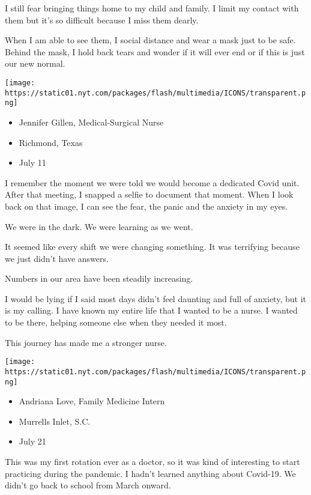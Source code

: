 I still fear bringing things home to my child and family. I limit my
contact with them but it's so difficult because I miss them dearly.

When I am able to see them, I social distance and wear a mask just to be
safe. Behind the mask, I hold back tears and wonder if it will ever end
or if this is just our new normal.

\texttt{[image: https://static01.nyt.com/packages/flash/multimedia/ICONS/transparent.png]}

\begin{itemize}
\tightlist
\item
  Jennifer Gillen, Medical-Surgical Nurse
\item
  Richmond, Texas
\item
  July 11
\end{itemize}

I remember the moment we were told we would become a dedicated Covid
unit. After that meeting, I snapped a selfie to document that moment.
When I look back on that image, I can see the fear, the panic and the
anxiety in my eyes.

We were in the dark. We were learning as we went.

It seemed like every shift we were changing something. It was terrifying
because we just didn't have answers.

Numbers in our area have been steadily increasing.

I would be lying if I said most days didn't feel daunting and full of
anxiety, but it is my calling. I have known my entire life that I wanted
to be a nurse. I wanted to be there, helping someone else when they
needed it most.

This journey has made me a stronger nurse.

\texttt{[image: https://static01.nyt.com/packages/flash/multimedia/ICONS/transparent.png]}

\begin{itemize}
\tightlist
\item
  Andriana Love, Family Medicine Intern
\item
  Murrells Inlet, S.C.
\item
  July 21
\end{itemize}

This was my first rotation ever as a doctor, so it was kind of
interesting to start practicing during the pandemic. I hadn't learned
anything about Covid-19. We didn't go back to school from March onward.

